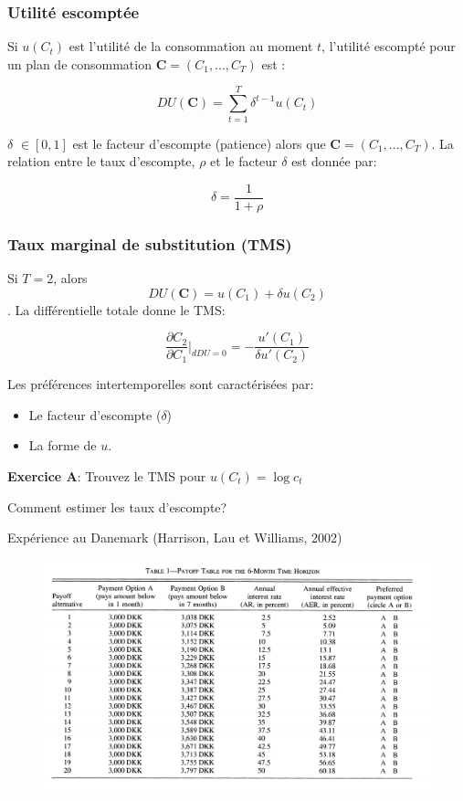 \documentclass[handout]{beamer}
\begin{document}
\begin{frame}\frametitle{Utilité escomptée}

Si $u(C_t)$ est l'utilité de la consommation au moment $t$, l'utilité escompté pour un plan de consommation $\textbf{C} = (C_1,...,C_T)$ est :


$$ DU(\mathbf{C}) = \sum_{t=1}^T \delta^{t-1} u(C_t) $$

$\delta$ $\in [0,1]$ est le facteur d'escompte (patience) alors que $\mathbf{C} = (C_1,...,C_T)$. La relation entre le taux d'escompte, $\rho$ et le facteur $\delta$ est donnée par: 

$$ \delta = \frac{1}{1+\rho} $$

\end{frame}

\begin{frame}\frametitle{Taux marginal de substitution (TMS)}

Si $T=2$, alors $$ DU(\textbf{C}) = u(C_1) +  \delta u(C_2) $$. La différentielle totale donne le TMS: 

$$ \frac{\partial C_2}{\partial C_1}\rvert_{dDU=0} = -\frac{u'(C_1)}{\delta u'(C_2)}$$

Les préférences intertemporelles sont caractérisées par: 

\begin{itemize}
\item Le facteur d'escompte ($\delta$)
\item La forme de $u$. 
\end{itemize}

\textbf{Exercice A}: Trouvez le TMS pour $u(C_t) = \log c_t$

\end{frame}


\begin{frame}{Comment estimer les taux d'escompte?}

Expérience au Danemark  (Harrison, Lau et Williams, 2002)

\begin{figure}
\includegraphics[scale=0.5]{MPL.png}
\end{figure}


\end{frame}
\end{document}
